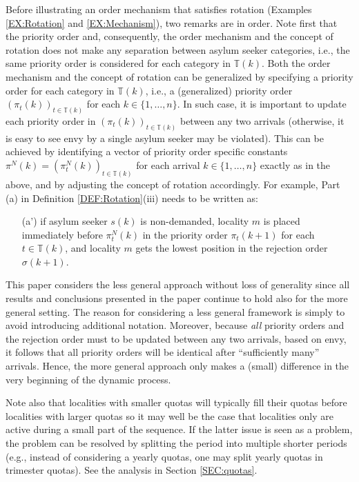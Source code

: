 \documentclass[12pt,fleqn]{article}
\begin{document}
\noindent Before illustrating an order mechanism that satisfies rotation (Examples \ref{EX:Rotation} and \ref{EX:Mechanism}), two remarks are in order. Note first that the priority order and, consequently, the order mechanism and the concept of rotation does not make any separation between asylum seeker categories, i.e., the same priority order is considered for each category in $\mathbb{T}(k)$. Both the order mechanism and the concept of rotation can be generalized by specifying a priority order for each category in $\mathbb{T}(k)$, i.e., a (generalized) priority order $(\pi_t(k))_{t\in \mathbb{T}(k)}$ for each $k\in\{1,\ldots,n\}$. In such case, it is important to update each priority order in $(\pi_t(k))_{t\in \mathbb{T}(k)}$ between any two arrivals (otherwise, it is easy to see envy by a single asylum seeker may be violated). This can be achieved by identifying a vector of priority order specific constants $\pi^N(k)=(\pi_t^N(k))_{t\in \mathbb{T}(k)}$ for each arrival $k\in\{1,\ldots,n\}$ exactly as in the above, and by adjusting the concept of rotation accordingly. For example, Part (a) in Definition \ref{DEF:Rotation}(iii) needs to be written as:
\begin{enumerate}
\item[(a')] if asylum seeker $s(k)$ is non-demanded, locality $m$ is placed immediately before $\pi_t^N(k)$ in the priority order $\pi_t(k+1)$ for each $t\in \mathbb{T}(k)$, and locality $m$ gets the lowest position in the rejection order $\sigma(k+1)$.
\end{enumerate}
\noindent This paper considers the less general approach without loss of generality since all results and conclusions presented in the paper continue to hold also for the more general setting. The reason for considering a less general framework is simply to avoid introducing additional notation. Moreover, because \emph{all} priority orders and the rejection order must to be updated between any two arrivals, based on envy, it follows that all priority orders will be identical after ``sufficiently many'' arrivals. Hence, the more general approach only makes a (small) difference in the very beginning of the dynamic process.

Note also that localities with smaller quotas will typically fill their quotas before localities with larger quotas so it may well be the case that localities only are active during a small part of the sequence. If the latter issue is seen as a problem, the problem can be resolved by splitting the period into multiple shorter periods (e.g., instead of considering a yearly quotas, one may split yearly quotas in trimester quotas). See the analysis in Section \ref{SEC:quotas}.
\end{document}

